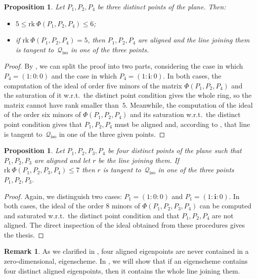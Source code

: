 \documentclass{amsart}
\theoremstyle{plain}
\newtheorem{prop}[lemma]{Proposition}
\theoremstyle{definition}
\newtheorem{rmk}[lemma]{Remark}
\newcommand{\iso}{\mathcal{Q}_{\mathrm{iso}}}
\newcommand{\iii}{\textbf{i}}
\newcommand{\rk}{\ensuremath{\mathrm{rk}}}
\begin{document}
\begin{prop}
\label{manca il riferimento su ancillary  non e': condition_rank_aligned}
Let $P_1, P_2, P_4$ be three distinct points of the plane. Then:
%
\begin{itemize}
 \item $5 \leq \rk \ \Phi(P_1, P_2, P_4) \leq 6$;
 \item if
 $\rk \ \Phi(P_1, P_2, P_4) = 5$, then $P_1, P_2, P_4$
 are aligned and the line joining them is tangent to~$\iso$
 in one of the three points.
\end{itemize}
%
\end{prop}
\begin{proof}
By , we can split the proof into two parts, considering the case in
which $P_4 = (1: 0: 0)$ and the case in which $P_4 = (1: \iii: 0)$.
In both cases, the computation of the ideal of order five minors of the matrix
$\Phi(P_1, P_2, P_4)$ and the saturation of it w.r.t.\ the distinct point condition gives the whole ring, so the matrix cannot have rank smaller than~$5$.
Meanwhile, the computation
of the ideal of the order six minors of $\Phi(P_1, P_2, P_4)$ and its
saturation w.r.t.\ the distinct point condition gives that
$P_1, P_2, P_4$ must be aligned and, according to ,
that line is tangent to~$\iso$ in one of the three given points.
\end{proof}


\begin{prop}
\label{prop:condition3+1}
Let $P_1, P_2, P_3, P_4$ be four distinct points of the plane such that
$P_1, P_2, P_3$ are aligned and let $r$
be the line joining them. If
$\rk \ \Phi(P_1, P_2, P_3, P_4) \leq 7$ then $r$ is tangent to~$\iso$ in one of the three points $P_1, P_2, P_3$.
\end{prop}
\begin{proof}
Again, we distinguish two cases: $P_1 = (1: 0: 0)$ and
$P_1 = (1: \iii: 0)$. In both cases, the ideal of the order $8$
minors of $\Phi(P_1, P_2, P_3, P_4)$ can be computed and saturated
w.r.t.\ the distinct point condition and that
$P_1, P_2, P_4$ are not aligned.
The direct inspection of the ideal obtained from these procedures gives the thesis.
\end{proof}

\begin{rmk}
 As we clarified in , four aligned eigenpoints are never contained in a zero-dimensional, eigenscheme. In , we will show that if an eigenscheme contains four distinct aligned eigenpoints, then it contains the whole line joining them.
\end{rmk}
\end{document}
